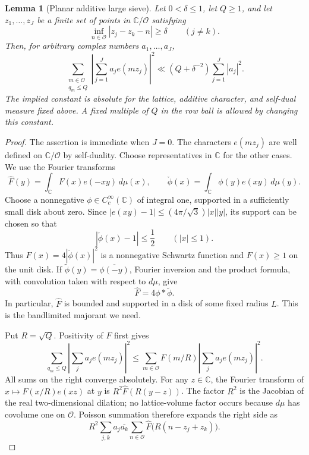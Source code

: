 \documentclass[11pt,a4paper]{article}
\numberwithin{equation}{section}
\numberwithin{figure}{section}
\newtheorem{lemma}[theorem]{Lemma}
\theoremstyle{definition}
\theoremstyle{remark}
\begin{document}
\begin{lemma}[Planar additive large sieve]
\label{lem:planar-additive-sieve}
Let $0<\delta\le1$, let $Q\ge1$, and let $z_1,\ldots,z_J$ be a finite set
of points in $\mathbb C/\mathcal O$ satisfying
\[
 \inf_{n\in\mathcal O}|z_j-z_k-n|\ge\delta
 \qquad(j\ne k).
\]
Then, for arbitrary complex numbers $a_1,\ldots,a_J$,
\[
 \sum_{\substack{m\in\mathcal O\\q_m\le Q}}
 \left|\sum_{j=1}^J a_j e(mz_j)\right|^2
 \ll (Q+\delta^{-2})\sum_{j=1}^J|a_j|^2.
\]
The implied constant is absolute for the lattice, additive character, and
self-dual measure fixed above.  A fixed multiple of $Q$ in the row ball is
allowed by changing this constant.
\end{lemma}

\begin{proof}
The assertion is immediate when $J=0$.  The characters $e(mz_j)$ are
well defined on $\mathbb C/\mathcal O$ by self-duality.  Choose
representatives in $\mathbb C$ for the other cases.  We use the Fourier transforms
\[
 \widehat F(y)=\int_{\mathbb C}F(x)e(-xy)\,d\mu(x),\qquad
 \check\phi(x)=\int_{\mathbb C}\phi(y)e(xy)\,d\mu(y).
\]
Choose a nonnegative $\phi\in C_c^\infty(\mathbb C)$ of integral one,
supported in a sufficiently small disk about zero.  Since
$|e(xy)-1|\le (4\pi/\sqrt3)|x||y|$, its support can be chosen so that
\[
 |\check\phi(x)-1|\le\frac12\qquad(|x|\le1).
\]
Thus $F(x)=4|\check\phi(x)|^2$ is a nonnegative Schwartz function and
$F(x)\ge1$ on the unit disk.  If
$\widetilde\phi(y)=\overline{\phi(-y)}$, Fourier inversion and the product
formula, with convolution taken with respect to $d\mu$, give
\[
 \widehat F=4\phi*\widetilde\phi.
\]
In particular, $\widehat F$ is bounded and supported in a disk of some fixed
radius $L$.  This is the bandlimited majorant we need.

Put $R=\sqrt Q$.  Positivity of $F$ first gives
\[
 \sum_{q_m\le Q}\left|\sum_j a_je(mz_j)\right|^2
 \le \sum_{m\in\mathcal O}F(m/R)
                    \left|\sum_j a_je(mz_j)\right|^2.
\]
All sums on the right converge absolutely.  For any $z\in\mathbb C$,
the Fourier transform of $x\mapsto F(x/R)e(xz)$ at $y$ is
$R^2\widehat F(R(y-z))$.  The factor $R^2$ is the Jacobian of the real
two-dimensional dilation; no lattice-volume factor occurs because $d\mu$
has covolume one on $\mathcal O$.  Poisson summation therefore expands the
right side as
\[
 R^2\sum_{j,k}a_j\overline{a_k}
       \sum_{n\in\mathcal O}
       \widehat F\bigl(R(n-z_j+z_k)\bigr).
\]


\end{proof}
\end{document}
